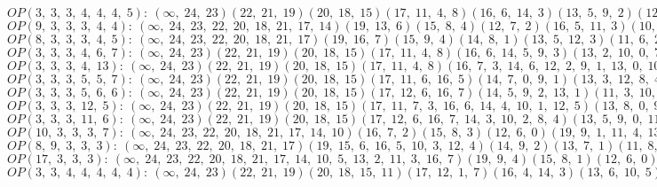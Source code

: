 $OP(3, \;3, \;3, \;4, \;4, \;4, \;5): \:(\infty, \;24, \;23)(22, \;21, \;19)(20, \;18, \;15)(17, \;11, \;4, \;8)(16, \;6, \;14, \;3)(13, \;5, \;9, \;2)(12, \;7, \;1, \;10, \;0)$\\
$OP(9, \;3, \;3, \;3, \;4, \;4): \:(\infty, \;24, \;23, \;22, \;20, \;18, \;21, \;17, \;14)(19, \;13, \;6)(15, \;8, \;4)(12, \;7, \;2)(16, \;5, \;11, \;3)(10, \;1, \;9, \;0)$\\
$OP(8, \;3, \;3, \;3, \;4, \;5): \:(\infty, \;24, \;23, \;22, \;20, \;18, \;21, \;17)(19, \;16, \;7)(15, \;9, \;4)(14, \;8, \;1)(13, \;5, \;12, \;3)(11, \;6, \;2, \;10, \;0)$\\
$OP(3, \;3, \;3, \;4, \;6, \;7): \:(\infty, \;24, \;23)(22, \;21, \;19)(20, \;18, \;15)(17, \;11, \;4, \;8)(16, \;6, \;14, \;5, \;9, \;3)(13, \;2, \;10, \;0, \;7, \;12, \;1)$\\
$OP(3, \;3, \;3, \;4, \;13): \:(\infty, \;24, \;23)(22, \;21, \;19)(20, \;18, \;15)(17, \;11, \;4, \;8)(16, \;7, \;3, \;14, \;6, \;12, \;2, \;9, \;1, \;13, \;0, \;10, \;5)$\\
$OP(3, \;3, \;3, \;5, \;5, \;7): \:(\infty, \;24, \;23)(22, \;21, \;19)(20, \;18, \;15)(17, \;11, \;6, \;16, \;5)(14, \;7, \;0, \;9, \;1)(13, \;3, \;12, \;8, \;4, \;10, \;2)$\\
$OP(3, \;3, \;3, \;5, \;6, \;6): \:(\infty, \;24, \;23)(22, \;21, \;19)(20, \;18, \;15)(17, \;12, \;6, \;16, \;7)(14, \;5, \;9, \;2, \;13, \;1)(11, \;3, \;10, \;4, \;8, \;0)$\\
$OP(3, \;3, \;3, \;12, \;5): \:(\infty, \;24, \;23)(22, \;21, \;19)(20, \;18, \;15)(17, \;11, \;7, \;3, \;16, \;6, \;14, \;4, \;10, \;1, \;12, \;5)(13, \;8, \;0, \;9, \;2)$\\
$OP(3, \;3, \;3, \;11, \;6): \:(\infty, \;24, \;23)(22, \;21, \;19)(20, \;18, \;15)(17, \;12, \;6, \;16, \;7, \;14, \;3, \;10, \;2, \;8, \;4)(13, \;5, \;9, \;0, \;11, \;1)$\\
$OP(10, \;3, \;3, \;3, \;7): \:(\infty, \;24, \;23, \;22, \;20, \;18, \;21, \;17, \;14, \;10)(16, \;7, \;2)(15, \;8, \;3)(12, \;6, \;0)(19, \;9, \;1, \;11, \;4, \;13, \;5)$\\
$OP(8, \;9, \;3, \;3, \;3): \:(\infty, \;24, \;23, \;22, \;20, \;18, \;21, \;17)(19, \;15, \;6, \;16, \;5, \;10, \;3, \;12, \;4)(14, \;9, \;2)(13, \;7, \;1)(11, \;8, \;0)$\\
$OP(17, \;3, \;3, \;3): \:(\infty, \;24, \;23, \;22, \;20, \;18, \;21, \;17, \;14, \;10, \;5, \;13, \;2, \;11, \;3, \;16, \;7)(19, \;9, \;4)(15, \;8, \;1)(12, \;6, \;0)$\\
$OP(3, \;3, \;4, \;4, \;4, \;4, \;4): \:(\infty, \;24, \;23)(22, \;21, \;19)(20, \;18, \;15, \;11)(17, \;12, \;1, \;7)(16, \;4, \;14, \;3)(13, \;6, \;10, \;5)(9, \;2, \;8, \;0)$\\
